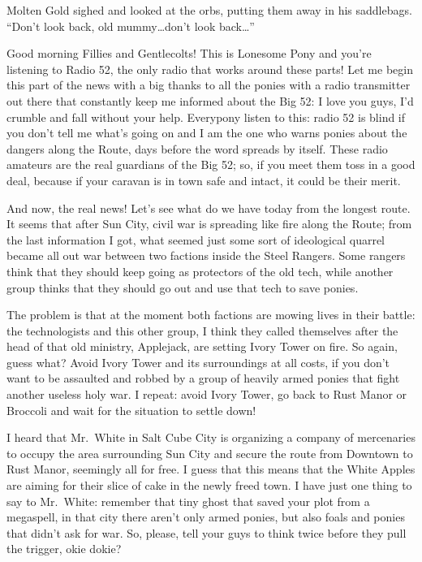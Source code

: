 Molten Gold sighed and looked at the orbs, putting them away in his saddlebags. ``Don't look back, old mummy\dots don't look back\dots''

\horizonline


{\rt Good morning Fillies and Gentlecolts! This is Lonesome Pony and you're listening to Radio 52, the only radio that works around these parts! Let me begin this part of the news with a big thanks to all the ponies with a radio transmitter out there that constantly keep me informed about the Big 52: I love you guys, I'd crumble and fall without your help. Everypony listen to this: radio 52 is blind if you don't tell me what's going on and I am the one who warns ponies about the dangers along the Route, days before the word spreads by itself. These radio amateurs are the real guardians of the Big 52; so, if you meet them toss in a good deal, because if your caravan is in town safe and intact, it could be their merit.

And now, the real news! Let's see what do we have today from the longest route. It seems that after Sun City, civil war is spreading like fire along the Route; from the last information I got, what seemed just some sort of ideological quarrel became all out war between two factions inside the Steel Rangers. Some rangers think that they should keep going as protectors of the old tech, while another group thinks that they should go out and use that tech to save ponies.

The problem is that at the moment both factions are mowing lives in their battle: the technologists and this other group, I think they called themselves after the head of that old ministry, Applejack, are setting Ivory Tower on fire. So again, guess what? Avoid Ivory Tower and its surroundings at all costs, if you don't want to be assaulted and robbed by a group of heavily armed ponies that fight another useless holy war. I repeat: avoid Ivory Tower, go back to Rust Manor or Broccoli and wait for the situation to settle down!

I heard that Mr.~White in Salt Cube City is organizing a company of mercenaries to occupy the area surrounding Sun City and secure the route from Downtown to Rust Manor, seemingly all for free. I guess that this means that the White Apples are aiming for their slice of cake in the newly freed town. I have just one thing to say to Mr.~White: remember that tiny ghost that saved your plot from a megaspell, in that city there aren't only armed ponies, but also foals and ponies that didn't ask for war. So, please, tell your guys to think twice before they pull the trigger, okie dokie?}

